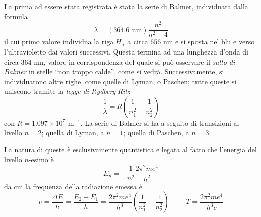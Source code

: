 \documentclass[11pt, a4paper]{scrartcl}
\theoremstyle{style}
\theoremstyle{style1}
\newenvironment{boxenv}[1][]{
    \begin{eqbox}[#1]
    }{
   \end{eqbox}
}
\numberwithin{equation}{subsection}
\begin{document}
La prima ad essere stata registrata \`e stata la serie di Balmer, individuata dalla formula
\[
\lambda  = (364.6 \text{ nm}) \frac{n^2}{n^2 - 4}
\] 
il cui primo valore individua la riga $H_\alpha $ a circa $656$ nm e si sposta nel blu e verso l'ultravioletto dai valori successivi. 
Questa termina ad una lunghezza d'onda di circa $364$ nm, valore in corrispondenza del quale si pu\`o osservare il \textit{salto di Balmer} in stelle ``non troppo calde'', come si vedr\`a.
Successivamente, si individuarono altre righe, come quelle di Lyman, o Paschen; tutte queste si uniscono tramite la \textit{legge di Rydberg-Ritz} 
\[
\frac{1}{\lambda }= R \left(\frac{1}{n_1^2}-\frac{1}{n_2^2}\right) 
\] 
con $R = 1.097 \times 10^7 \text{ m}^{-1}$.
La serie di Balmer si ha a seguito di transizioni al livello $n=2$; quella di Lyman, a $n=1$; quella di Paschen, a $n=3$. 
\begin{boxenv}[]
La natura di queste \`e esclusivamente quantistica e legata al fatto che l'energia del livello $n$-esimo \`e
\[
E_n = -\frac{1}{n^2} \frac{2\pi^2m e^4}{h^2}
\] 
da cui la frequenza della radiazione emessa \`e
\[
\nu  = \frac{\Delta E}{h} = \frac{E_2-E_1}{h} = \frac{2\pi ^2 m e^4}{h^3} \left(\frac{1}{n_1^2}-\frac{1}{n_2^2}\right) \hspace{1cm} T = \frac{2\pi^2 m e^4}{h^3 c}
\] 
\end{boxenv}
\end{document}
